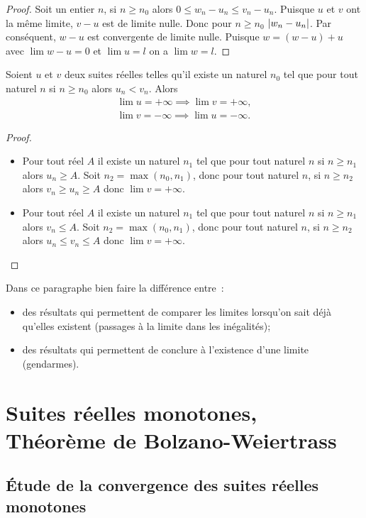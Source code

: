 \begin{proof}
  Soit un entier $n$, si $n \geq n_0$ alors $0 \leq w_n-u_n \leq v_n -u_n$. Puisque $u$ et $v$ ont la même limite, $v-u$ est de limite nulle. Donc pour $n \geq n_0$ $\left\lvert w_n-u_n\right\rvert$. Par conséquent, $w-u$ est convergente de limite nulle. Puisque $w=(w-u)+u$ avec $\lim w-u=0$ et $\lim u=l$ on a $\lim w =l$.
\end{proof}
\begin{prop}
  Soient $u$ et $v$ deux suites réelles telles qu'il existe un naturel $n_0$ tel que pour tout naturel $n$ si $n \geq n_0$ alors $u_n<v_n$. Alors
  \begin{gather}
    \lim u =+\infty \implies \lim v =+\infty,\\
    \lim v =-\infty \implies \lim u =-\infty.
  \end{gather}
\end{prop}
\begin{proof}
  \begin{itemize}
  \item Pour tout réel $A$ il existe un naturel $n_1$ tel que pour tout naturel $n$ si $n \geq n_1$ alors $u_n \geq A$. Soit $n_2=\max(n_0,n_1)$, donc pour tout naturel $n$, si $n \geq n_2$ alors $v_n \geq u_n \geq A$ donc $\lim v=+\infty$.
  \item Pour tout réel $A$ il existe un naturel $n_1$ tel que pour tout naturel $n$ si $n \geq n_1$ alors $v_n \leq A$. Soit $n_2=\max(n_0,n_1)$, donc pour tout naturel $n$, si $n \geq n_2$ alors $u_n \leq v_n \leq A$ donc $\lim v=+\infty$.
  \end{itemize}
\end{proof}
Dans ce paragraphe bien faire la différence entre~:
\begin{itemize}
\item des résultats qui permettent de comparer les limites lorsqu'on sait déjà qu'elles existent (passages à la limite dans les inégalités);
\item des résultats qui permettent de conclure à l'existence d'une limite (gendarmes).
\end{itemize}

\section{Suites réelles monotones, Théorème de Bolzano-Weiertrass}

\subsection{Étude de la convergence des suites réelles monotones}

